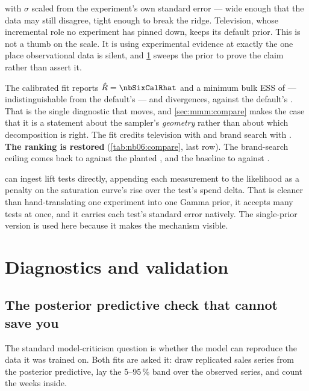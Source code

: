 with $\sigma$ scaled from the experiment's own standard error --- wide enough that the data may
still disagree, tight enough to break the ridge. Television, whose incremental role no experiment
has pinned down, keeps its default prior. This is not a thumb on the scale. It is using
experimental evidence at exactly the one place observational data is silent, and
\cref{sec:mmm:valid} sweeps the prior to prove the claim rather than assert it.

The calibrated fit reports $\hat R = \nbSixCalRhat$ and a minimum bulk ESS of \nbSixCalEss{} ---
indistinguishable from the default's --- and \nbSixCalDiv{} divergences, against the default's
\nbSixDefDiv. That is the single diagnostic that moves, and \cref{sec:mmm:compare} makes the case
that it is a statement about the sampler's \emph{geometry} rather than about which decomposition is
right. The fit credits television with \eur{\nbSixCalTv} and brand search with \eur{\nbSixCalBs}.
\textbf{The ranking is restored} (\cref{tab:nb06:compare}, last row). The brand-search ceiling comes back to \eur{\nbSixCalCeilingBs} against the planted
\eur{\nbSixTrueCeilingBs}, and the baseline to \eur{\nbSixCalBaseline} against .

\begin{remark}
 can ingest lift tests directly, appending each measurement to the likelihood
as a penalty on the saturation curve's rise over the test's spend delta. That is cleaner than
hand-translating one experiment into one Gamma prior, it accepts many tests at once, and it carries
each test's standard error natively. The single-prior version is used here because it makes the
mechanism visible.
\end{remark}

\section{Diagnostics and validation}
\label{sec:mmm:valid}

\subsection*{The posterior predictive check that cannot save you}

The standard model-criticism question is whether the model can reproduce the data it was trained
on. Both fits are asked it: draw replicated sales series from the posterior predictive, lay the
5--95\,\% band over the observed series, and count the weeks inside.

